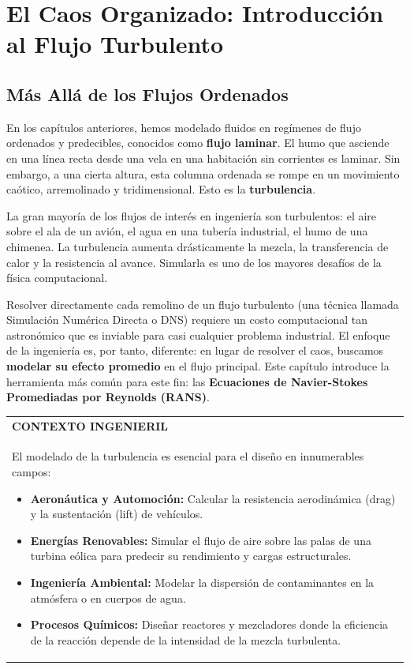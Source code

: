 \chapter{El Caos Organizado: Introducción al Flujo Turbulento}
\label{chap:turbulence}

\section{Más Allá de los Flujos Ordenados}

En los capítulos anteriores, hemos modelado fluidos en regímenes de flujo ordenados y predecibles, conocidos como \textbf{flujo laminar}. El humo que asciende en una línea recta desde una vela en una habitación sin corrientes es laminar. Sin embargo, a una cierta altura, esta columna ordenada se rompe en un movimiento caótico, arremolinado y tridimensional. Esto es la \textbf{turbulencia}.

La gran mayoría de los flujos de interés en ingeniería son turbulentos: el aire sobre el ala de un avión, el agua en una tubería industrial, el humo de una chimenea. La turbulencia aumenta drásticamente la mezcla, la transferencia de calor y la resistencia al avance. Simularla es uno de los mayores desafíos de la física computacional.

Resolver directamente cada remolino de un flujo turbulento (una técnica llamada Simulación Numérica Directa o DNS) requiere un costo computacional tan astronómico que es inviable para casi cualquier problema industrial. El enfoque de la ingeniería es, por tanto, diferente: en lugar de resolver el caos, buscamos \textbf{modelar su efecto promedio} en el flujo principal. Este capítulo introduce la herramienta más común para este fin: las \textbf{Ecuaciones de Navier-Stokes Promediadas por Reynolds (RANS)}.

\begin{center}
\begin{tabular}{|p{}|}
\hline
\textbf{CONTEXTO INGENIERIL} \\
El modelado de la turbulencia es esencial para el diseño en innumerables campos:
\begin{itemize}
    \item \textbf{Aeronáutica y Automoción:} Calcular la resistencia aerodinámica (drag) y la sustentación (lift) de vehículos.
    \item \textbf{Energías Renovables:} Simular el flujo de aire sobre las palas de una turbina eólica para predecir su rendimiento y cargas estructurales.
    \item \textbf{Ingeniería Ambiental:} Modelar la dispersión de contaminantes en la atmósfera o en cuerpos de agua.
    \item \textbf{Procesos Químicos:} Diseñar reactores y mezcladores donde la eficiencia de la reacción depende de la intensidad de la mezcla turbulenta.
\end{itemize}
\\
\hline
\end{tabular}
\end{center}

